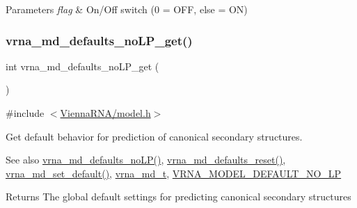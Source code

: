 \begin{DoxyParams}{Parameters}
{\em flag} & On/\+Off switch (0 = O\+FF, else = ON) \\
\hline
\end{DoxyParams}
\mbox{\label{group__model__details_ga934344888fbacaed538bbbfe910f2aa6}} 
\subsubsection{\texorpdfstring{vrna\+\_\+md\+\_\+defaults\+\_\+no\+L\+P\+\_\+get()}{vrna\_md\_defaults\_noLP\_get()}}
{\footnotesize\ttfamily int vrna\+\_\+md\+\_\+defaults\+\_\+no\+L\+P\+\_\+get (\begin{DoxyParamCaption}\item[{void}]{ }\end{DoxyParamCaption})}



{\ttfamily \#include $<$\mbox{\hyperlink{model_8h}{Vienna\+R\+N\+A/model.\+h}}$>$}



Get default behavior for prediction of canonical secondary structures. 

\begin{DoxySeeAlso}{See also}
\mbox{\hyperlink{group__model__details_ga2f88ffc393ac9d7987849c965fd29ea8}{vrna\+\_\+md\+\_\+defaults\+\_\+no\+L\+P()}}, \mbox{\hyperlink{group__model__details_ga70834424cf804d149937de89f80ceb45}{vrna\+\_\+md\+\_\+defaults\+\_\+reset()}}, \mbox{\hyperlink{group__model__details_ga8ac6ff84936282436f822644bf841f66}{vrna\+\_\+md\+\_\+set\+\_\+default()}}, \mbox{\hyperlink{group__model__details_ga1f8a10e12a0a1915f2a4eff0b28ea17c}{vrna\+\_\+md\+\_\+t}}, \mbox{\hyperlink{group__model__details_gab72462726dd60ed0d43339bbf7ee08ad}{V\+R\+N\+A\+\_\+\+M\+O\+D\+E\+L\+\_\+\+D\+E\+F\+A\+U\+L\+T\+\_\+\+N\+O\+\_\+\+LP}} 
\end{DoxySeeAlso}
\begin{DoxyReturn}{Returns}
The global default settings for predicting canonical secondary structures 
\end{DoxyReturn}
\mbox{\label{group__model__details_ga98218f85c7a957a1d1ddf4627fdf5a39}} 
